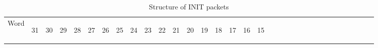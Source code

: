 \documentclass[11pt]{article}
\begin{document}
\begin{table}[h!]
    \centering
    \label{tab:InitDef}
    \caption{Structure of INIT packets}
    \begin{tabular}{|p{1cm}|m{0.04cm}|m{0.04cm}|m{0.04cm}|m{0.04cm}|m{0.04cm}|m{0.04cm}|m{0.04cm}|m{0.04cm}|m{0.04cm}|
        m{0.04cm}|m{0.04cm}|m{0.04cm}|m{0.04cm}|m{0.04cm}|m{0.04cm}|m{0.04cm}|m{0.04cm}|m{0.04cm}|m{0.04cm}|m{0.04cm}|
        m{0.04cm}|m{0.04cm}|m{0.04cm}|m{0.04cm}|m{0.04cm}|m{0.04cm}|m{0.04cm}|m{0.04cm}|m{0.04cm}|m{0.04cm}|m{0.04cm}|m{0.04cm}|}
        \hline
        Word & 
        \begin{sideways}31\end{sideways} &
        \begin{sideways}30\end{sideways} & 
        \begin{sideways}29\end{sideways} &
        \begin{sideways}28\end{sideways} &
        \begin{sideways}27\end{sideways} &
        \begin{sideways}26\end{sideways} &
        \begin{sideways}25\end{sideways} &
        \begin{sideways}24\end{sideways} &
        \begin{sideways}23\end{sideways} &
        \begin{sideways}22\end{sideways} &
        \begin{sideways}21\end{sideways} &
        \begin{sideways}20\end{sideways} &
        \begin{sideways}19\end{sideways} &
        \begin{sideways}18\end{sideways} &
        \begin{sideways}17\end{sideways} &
        \begin{sideways}16\end{sideways} &
        \begin{sideways}15\end{sideways} &

\end{tabular}
\end{table}
\end{document}
